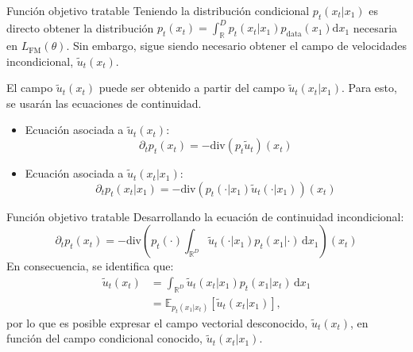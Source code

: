 \documentclass{beamer}
\newcommand{\R}{\mathbb{R}}
\begin{document}
\begin{frame}{Función objetivo tratable}
    Teniendo la distribución condicional $p_t(x_t|x_1)$ es directo obtener la distribución $p_t(x_t)=\int_\R^D p_t(x_t|x_1)p_\text{data}(x_1)\text{d}x_1$ necesaria en $L_\text{FM}(\theta)$. Sin embargo, sigue siendo necesario obtener el campo de velocidades incondicional, $\tilde u_t(x_t)$.

    El campo $\tilde u_t(x_t)$ puede ser obtenido a partir del campo $\tilde u_t(x_t|x_1)$. Para esto, se usarán las ecuaciones de continuidad.
    \begin{itemize}
        \item Ecuación asociada a $\tilde u_t(x_t)$:
              \begin{equation*}
                  \partial_t p_t(x_t)=-\text{div}\left(p_t \tilde u_t\right)(x_t)
              \end{equation*}
        \item Ecuación asociada a $\tilde u_t(x_t|x_1)$:
              \begin{equation*}
                  \partial_t p_t(x_t|x_1)=-\text{div}\left(p_t(\cdot|x_1)\tilde u_t(\cdot|x_1)\right)(x_t)
              \end{equation*}
    \end{itemize}
\end{frame}

\begin{frame}{Función objetivo tratable}
    Desarrollando la ecuación de continuidad incondicional:
    \begin{equation*}
        \partial_t p_t(x_t)
        =-\text{div}\left(p_t(\cdot)\int_{\R^D} \tilde u_t(\cdot|x_1)p_t(x_1|\cdot)\,\text{d}x_1\right)(x_t)
    \end{equation*}
    En consecuencia, se identifica que:
    \begin{align*}
        \tilde u_t(x_t) & =\int_{\R^D} \tilde u_t(x_t|x_1)p_t(x_1|x_t)\,\text{d}x_1    \\
                        & =\mathbb{E}_{p_t(x_1|x_t)}\left[ \tilde u_t(x_t|x_1)\right],
    \end{align*}
    por lo que es posible expresar el campo vectorial desconocido, $\tilde u_t(x_t)$, en función del campo condicional conocido, $\tilde u_t(x_t|x_1)$.
\end{frame}
\end{document}
